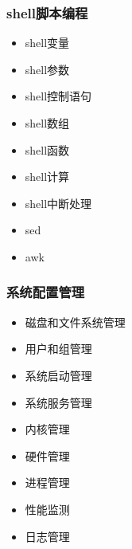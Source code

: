 \documentclass[xcolor=svgnames,bigger,presentation]{beamer}
\begin{document}
\begin{frame}
\frametitle{shell脚本编程}
\label{sec-1-2-2}
\begin{itemize}

\item shell变量
\label{sec-1-2-2-1}%

\item shell参数
\label{sec-1-2-2-2}%

\item shell控制语句
\label{sec-1-2-2-3}%

\item shell数组
\label{sec-1-2-2-4}%

\item shell函数
\label{sec-1-2-2-5}%

\item shell计算
\label{sec-1-2-2-6}%

\item shell中断处理
\label{sec-1-2-2-7}%

\item sed
\label{sec-1-2-2-8}%

\item awk
\label{sec-1-2-2-9}%
\end{itemize} %
\end{frame}
\begin{frame}
\frametitle{系统配置管理}
\label{sec-1-2-3}
\begin{itemize}

\item 磁盘和文件系统管理
\label{sec-1-2-3-1}%

\item 用户和组管理
\label{sec-1-2-3-2}%

\item 系统启动管理
\label{sec-1-2-3-3}%

\item 系统服务管理
\label{sec-1-2-3-4}%

\item 内核管理
\label{sec-1-2-3-5}%

\item 硬件管理
\label{sec-1-2-3-6}%

\item 进程管理
\label{sec-1-2-3-7}%

\item 性能监测
\label{sec-1-2-3-8}%

\item 日志管理
\label{sec-1-2-3-9}%
\end{itemize} %
\end{frame}
\end{document}
